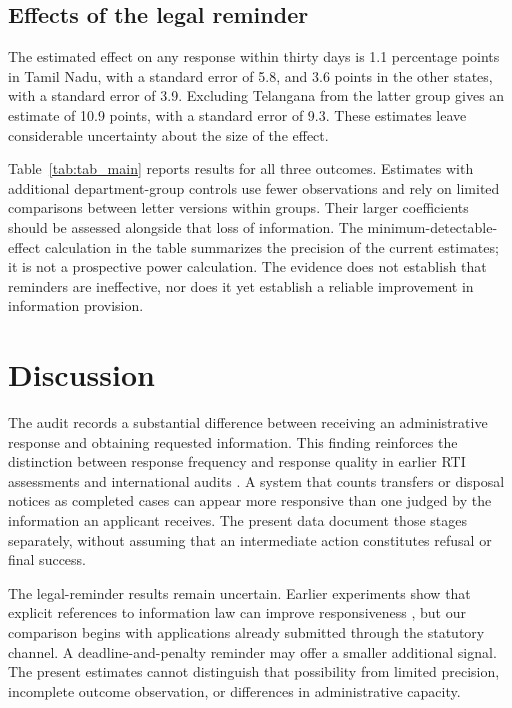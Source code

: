 \documentclass[11pt]{article}
\begin{document}
\subsection{Effects of the legal reminder}
The estimated effect on any response within thirty days is 1.1 percentage points in Tamil Nadu, with a standard error of 5.8, and 3.6 points in the other states, with a standard error of 3.9. Excluding Telangana from the latter group gives an estimate of 10.9 points, with a standard error of 9.3. These estimates leave considerable uncertainty about the size of the effect.

Table~\ref{tab:tab_main} reports results for all three outcomes. Estimates with additional department-group controls use fewer observations and rely on limited comparisons between letter versions within groups. Their larger coefficients should be assessed alongside that loss of information. The minimum-detectable-effect calculation in the table summarizes the precision of the current estimates; it is not a prospective power calculation. The evidence does not establish that reminders are ineffective, nor does it yet establish a reliable improvement in information provision.

\FloatBarrier

\section{Discussion}
The audit records a substantial difference between receiving an administrative response and obtaining requested information. This finding reinforces the distinction between response frequency and response quality in earlier RTI assessments and international audits \citep{raag2014,lagunes2019}. A system that counts transfers or disposal notices as completed cases can appear more responsive than one judged by the information an applicant receives. The present data document those stages separately, without assuming that an intermediate action constitutes refusal or final success.

The legal-reminder results remain uncertain. Earlier experiments show that explicit references to information law can improve responsiveness \citep{worthy2017,grimmelikhuijsen2019,spac2018}, but our comparison begins with applications already submitted through the statutory channel. A deadline-and-penalty reminder may offer a smaller additional signal. The present estimates cannot distinguish that possibility from limited precision, incomplete outcome observation, or differences in administrative capacity.
\end{document}
